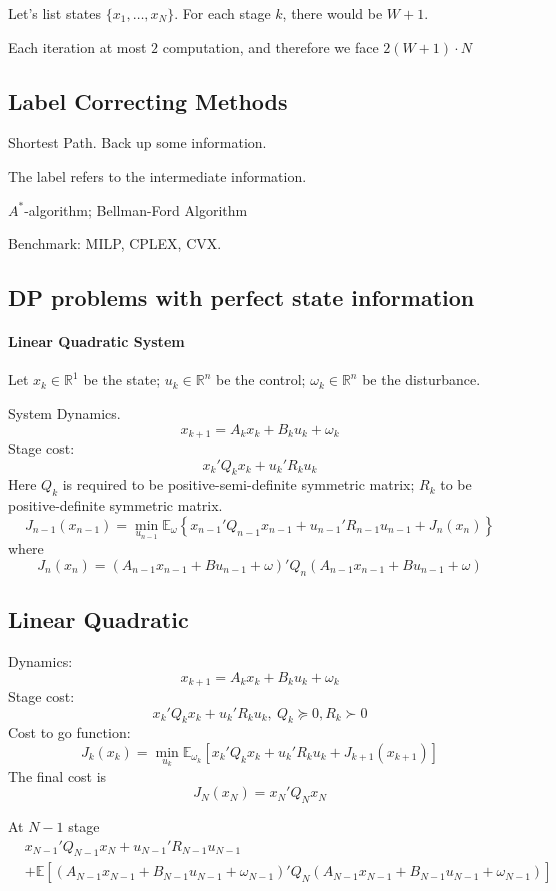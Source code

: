 Let's list states $\{x_1,\dots,x_N\}$. For each stage $k$, there would be $W+1$.

Each iteration at most $2$ computation, and therefore we face $2(W+1)\cdot N$

\subsection{Label Correcting Methods}
Shortest Path. Back up some information.

The label refers to the intermediate information.

$A^*$-algorithm; Bellman-Ford Algorithm

Benchmark: MILP, CPLEX, CVX.

\subsection{DP problems with perfect state information}

\paragraph{Linear Quadratic System}
Let $x_k\in\mathbb{R}^1$ be the state; $u_k\in\mathbb{R}^n$ be the control; $\omega_k\in\mathbb{R}^n$ be the disturbance.

System Dynamics.
\[
x_{k+1}=A_kx_k+B_ku_k+\omega_k
\]
Stage cost:
\[
x_k'Q_kx_k+u_k'R_ku_k
\]
Here $Q_k$ is required to be positive-semi-definite symmetric matrix; $R_k$ to be positive-definite symmetric matrix.
\[
J_{n-1}(x_{n-1})=\min_{u_{n-1}}\mathbb{E}_{\omega}
\left\{
x_{n-1}'Q_{n-1}x_{n-1}+u_{n-1}'R_{n-1}u_{n-1}
+
J_n(x_n)
\right\}
\]
where
\[
J_n(x_n)=(A_{n-1}x_{n-1}+Bu_{n-1}+\omega)'Q_n
(A_{n-1}x_{n-1}+Bu_{n-1}+\omega)
\]


\subsection{Linear Quadratic}
Dynamics:
\[
x_{k+1}=A_kx_k+B_ku_k+\omega_k
\]
Stage cost:
\[
x_k'Q_kx_k+u_k'R_ku_k, \ Q_k\succeq0, R_k\succ 0
\]
Cost to go function:
\[
J_k(x_k)=\min_{u_k}\mathbb{E}_{\omega_k}
[
x_k'Q_kx_k+u_k'R_ku_k
+
J_{k+1}(x_{k+1})
]
\]
The final cost is 
\[
J_N(x_N)=x_N'Q_Nx_N
\]

At $N-1$ stage
\begin{align*}
&x_{N-1}'Q_{N-1}x_N+u_{N-1}'R_{N-1}u_{N-1}\\
&+
\mathbb{E}
[
(A_{N-1}x_{N-1}+B_{N-1}u_{N-1}+\omega_{N-1})'
Q_{N}
(A_{N-1}x_{N-1}+B_{N-1}u_{N-1}+\omega_{N-1})
]
\end{align*}

